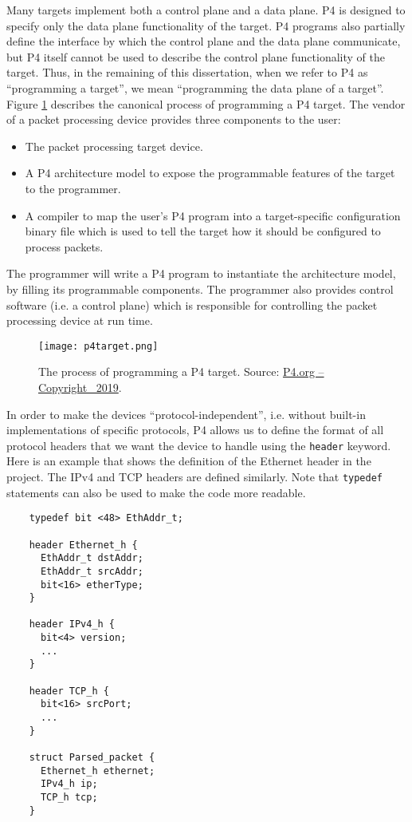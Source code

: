 Many targets implement both a control plane and a data plane. P4 is designed to specify only the data plane functionality of the target. P4 programs also partially define the interface by which the control plane and the data plane communicate, but P4 itself cannot be used to describe the control plane functionality of the target. Thus, in the remaining of this dissertation, when we refer to P4 as “programming a target”, we mean “programming the data plane of a target”. Figure \ref{p4target} describes the canonical process of programming a P4 target. The vendor of a packet processing device provides three components to the user:

\begin{itemize}
	\item The packet processing target device.
	\item A P4 architecture model to expose the programmable features of the target to the programmer.
	\item A compiler to map the user’s P4 program into a target-specific configuration binary file which is used to tell the target how it should be configured to process packets.
\end{itemize}

The programmer will write a P4 program to instantiate the architecture model, by filling its programmable components. The programmer also provides control software (i.e. a control plane) which is responsible for controlling the packet processing device at run time.

\begin{figure}[!ht]
	\centering
	\texttt{[image: p4target.png]}
	\caption{The process of programming a P4 target. Source: \href{https://p4.org}{P4.org -- Copyright \textcopyright\ 2019}.} 
	\label{p4target}
\end{figure}

In order to make the devices ``protocol-independent'', i.e. without built-in implementations of specific protocols, P4 allows us to define the format of all protocol headers that we want the device to handle using the \texttt{header} keyword. Here is an example that shows the definition of the Ethernet header in the project. The IPv4 and TCP headers are defined similarly. Note that \texttt{typedef} statements can also be used to make the code more readable.

{\renewcommand{\baselinestretch}{0.8}\small
	\begin{verbatim}
    typedef bit <48> EthAddr_t;

    header Ethernet_h {
      EthAddr_t dstAddr;
      EthAddr_t srcAddr;
      bit<16> etherType;
    }
    
    header IPv4_h {
      bit<4> version;
      ...
    }
    
    header TCP_h {
      bit<16> srcPort;
      ...
    }
    
   	struct Parsed_packet {
  	  Ethernet_h ethernet;
  	  IPv4_h ip;
  	  TCP_h tcp;
   	}
	\end{verbatim}
}

